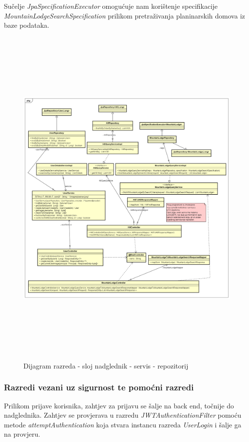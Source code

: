 			  Sučelje \textit{JpaSpecificationExecutor} omogućuje nam korištenje specifikacije \textit{MountainLodgeSearchSpecification} prilikom pretraživanja planinarskih domova iz baze podataka.
			\begin{figure}[H]
				\includegraphics[scale=0.6, height=175mm, width=165mm]{dijagrami/rest.png} %
				\centering
				\caption{Dijagram razreda - sloj nadglednik - servis - repozitorij}
				\label{fig:dijagrami_razreda4}
			\end{figure}
			\newpage
			\subsubsection{Razredi vezani uz sigurnost te pomoćni razredi}
			Prilikom prijave korisnika, zahtjev za prijavu se šalje na back end, točnije do nadglednika. Zahtjev se provjerava u razredu \textit{JWTAuthenticationFilter} pomoću metode \textit{attemptAuthentication} koja stvara instancu razreda \textit{UserLogin} i šalje ga na provjeru.
			 
